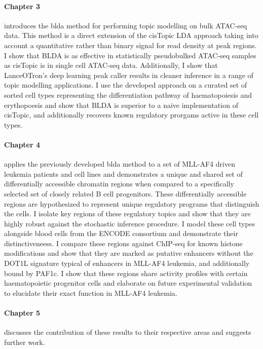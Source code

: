 \paragraph{Chapter 3} introduces the \gls{blda} method for performing topic modelling on bulk ATAC-seq data. This method is a direct extension of the cisTopic LDA approach taking into account a quantitative rather than binary signal for read density at peak regions. I show that BLDA is as effective in statistically pseudobulked ATAC-seq samples as cisTopic is in single cell ATAC-seq data. Additionally, I show that LanceOTron's deep learning peak caller results in cleaner inference in a range of topic modelling applications. I use the developed approach on a curated set of sorted cell types representing the differentiation pathway of haematopoiesis and erythopoesis and show that BLDA is superior to a naive implementation of cisTopic, and additionally recovers known regulatory prorgams active in these cell types.

\paragraph{Chapter 4} applies the previously developed \gls{blda} method to a set of MLL-AF4 driven leukemia patients and cell lines and demonstrates a unique and shared set of differentially accessible chromatin regions when compared to a specifically selected set of closely related B cell progenitors. These differentially accessible regions are hypothesized to represent unique regulatory programs that distinguish the cells. I isolate key regions of these regulatory topics and show that they are highly robust against the stochastic inference procedure. I model these cell types alongside blood cells from the ENCODE consortium and demonstrate their distinctiveneess. I compare these regions against ChIP-seq for known histone modifications and show that they are marked as putative enhancers without the DOT1L signature typical of enhancers in MLL-AF4 leukemia, and additionally bound by PAF1c. I show that these regions share activity profiles with certain haematopoietic progenitor cells and elaborate on future experimental validation to elucidate their exact function in MLL-AF4 leukemia.  

\paragraph{Chapter 5} discusses the contribution of these results to their respective areas and suggests further work.

